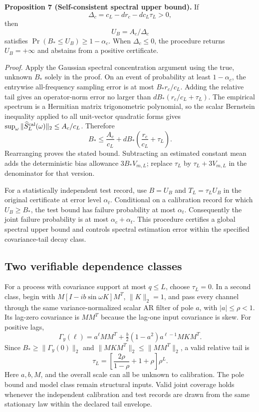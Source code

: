 \textbf{Proposition 7 (Self-consistent spectral upper bound).} If
\begin{equation}
 \Delta_c=c_L-d r_c-d c_L\tau_L>0,
\end{equation}
then
\begin{equation}\label{eq:calUappendix}
 U_B=A_c/\Delta_c
\end{equation}
satisfies $\Pr(B_*\le U_B)\ge1-\alpha_c$. When $\Delta_c\le0$, the procedure returns $U_B=+\infty$ and abstains from a positive certificate.

\emph{Proof.} Apply the Gaussian spectral concentration argument using the true, unknown $B_*$ solely in the proof. On an event of probability at least $1-\alpha_c$, the entrywise all-frequency sampling error is at most $B_*r_c/c_L$. Adding the relative tail gives an operator-norm error no larger than $dB_*(r_c/c_L+\tau_L)$. The empirical spectrum is a Hermitian matrix trigonometric polynomial, so the scalar Bernstein inequality applied to all unit-vector quadratic forms gives $\sup_\omega\|\widehat S_L^{\rm cal}(\omega)\|_2\le A_c/c_L$. Therefore
\begin{equation}
 B_*\le \frac{A_c}{c_L}+dB_*\left(\frac{r_c}{c_L}+\tau_L\right).
\end{equation}
Rearranging proves the stated bound. Subtracting an estimated constant mean adds the deterministic bias allowance $3B_*V_{m,L}$; replace $\tau_L$ by $\tau_L+3V_{m,L}$ in the denominator for that version.

For a statistically independent test record, use $B=U_B$ and $T_L=\tau_LU_B$ in the original certificate at error level $\alpha_t$. Conditional on a calibration record for which $U_B\ge B_*$, the test bound has failure probability at most $\alpha_t$. Consequently the joint failure probability is at most $\alpha_c+\alpha_t$. This procedure certifies a global spectral upper bound and controls spectral estimation error within the specified covariance-tail decay class.

\subsection{Two verifiable dependence classes}
For a process with covariance support at most $q\le L$, choose $\tau_L=0$. In a second class, begin with $M[I-ib\sin\omega K]M^T$, $\|K\|_2=1$, and pass every channel through the same variance-normalized scalar AR filter of pole $a$, with $|a|\le\rho<1$. Its lag-zero covariance is $MM^T$ because the lag-one input covariance is skew. For positive lags,
\begin{equation}
 \Gamma_y(\ell)=a^\ell MM^T+
 \tfrac b2(1-a^2)a^{\ell-1}MKM^T.
\end{equation}
Since $B_*\ge\|\Gamma_y(0)\|_2$ and $\|MKM^T\|_2\le\|MM^T\|_2$, a valid relative tail is
\begin{equation}\label{eq:arTailR4}
 \tau_L=\left[\frac{2\rho}{1-\rho}+1+\rho\right]\rho^L.
\end{equation}
Here $a,b,M$, and the overall scale can all be unknown to calibration. The pole bound and model class remain structural inputs. Valid joint coverage holds whenever the independent calibration and test records are drawn from the same stationary law within the declared tail envelope.
